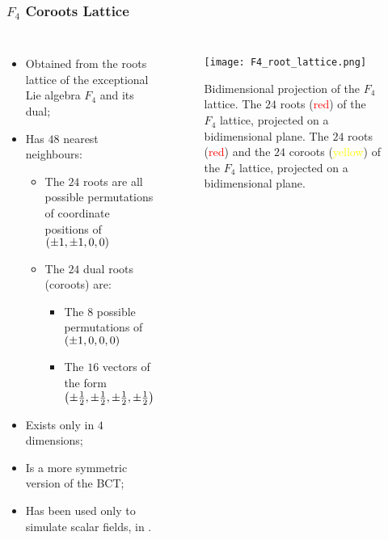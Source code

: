 \documentclass{beamer}
\begin{document}
\begin{frame}
  \frametitle{$F_4$ Coroots Lattice}
  \centering
  \begin{columns}
    \begin{itemize}
      \item<1->[\ding{228}] Obtained from the roots lattice of the exceptional Lie algebra $F_4$ and its dual;
      \item<2->[\ding{228}] Has $48$ nearest neighbours:
      \begin{itemize}
        \item The $24$ roots are all possible permutations of coordinate positions of $\left(\pm1,\pm1,0,0\right)$
        \vspace{0.25\baselineskip}
        \item<3-> The $24$ dual roots (coroots) are:
        \begin{itemize}
          \item<3->[\ding{109}] The $8$ possible permutations of $\left(\pm1,0,0,0\right)$
          \item<3->[\ding{109}] The $16$ vectors of the form $\left(\pm\frac12,\pm\frac12,\pm\frac12,\pm\frac12\right)$
        \end{itemize}
      \end{itemize}
      \item<4->[\ding{228}] Exists only in $4$ dimensions;
      \item<5->[\ding{228}] Is a more symmetric version of the BCT;
      \item<6->[\ding{228}] Has been used only to simulate scalar fields, in .
    \end{itemize}

    \begin{figure}
      \texttt{[image: F4\_root\_lattice.png]}
      \caption{
        {Bidimensional projection of the $F_4$ lattice.\vspace{2\baselineskip}}
        {The $24$ roots (\textcolor{red}{red}) of the $F_4$ lattice, projected on a bidimensional plane.\vspace{\baselineskip}}
        {The $24$ roots (\textcolor{red}{red}) and the $24$ coroots (\textcolor{yellow}{yellow}) of the $F_4$ lattice, projected on a bidimensional plane.}
      }
    \end{figure}
  \end{columns}
\end{frame}
\end{document}
